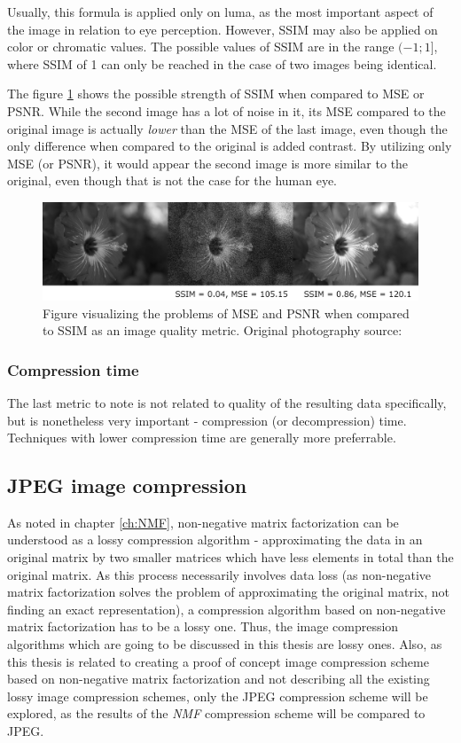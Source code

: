 \documentclass[thesis=M,english]{FITthesis}[2012/10/20]
\begin{document}
Usually, this formula is applied only on luma, as the most important aspect of the
image in relation to eye perception. However, SSIM may also be applied on color or
chromatic values. The possible values of SSIM are in the range $(-1; 1]$, where 
SSIM of 1 can only be reached in the case of two images being identical.

The figure \ref{fig:ssimmse} shows the possible strength of SSIM when compared to
MSE or PSNR. While the second image has a lot of noise in it, its MSE compared to
the original image is actually \emph{lower} than the MSE of the last image, even
though the only difference when compared to the original is added contrast.
By utilizing only MSE (or PSNR), it would appear the second image is more similar
to the original, even though that is not the case for the human eye.

\begin{figure}[h]
  \centering
  \includegraphics[scale=0.62]{imgs/flower_mse_psnr_ssim}
  \caption[Problems of MSE and PSNR as lossy compression quality metrics]{Figure visualizing the problems of MSE and PSNR when compared to
           SSIM as an image quality metric. Original photography source: \cite{imgcomprbenchmark}}
  \label{fig:ssimmse}
\end{figure}

\subsubsection{Compression time}
The last metric to note is not related to quality of the resulting data specifically,
but is nonetheless very important - compression (or decompression) time. Techniques
with lower compression time are generally more preferrable.

\subsection{JPEG image compression}
As noted in chapter \ref{ch:NMF}, non-negative matrix factorization can
be understood as a lossy compression algorithm - approximating the
data in an original matrix by two smaller matrices which have less
elements in total than the original matrix. As this process necessarily
involves data loss (as non-negative matrix factorization solves the problem
of approximating the original matrix, not finding an exact representation),
a compression algorithm based on non-negative matrix factorization has to be
a lossy one. Thus, the image compression algorithms which are going to be
discussed in this thesis are lossy ones. Also, as this thesis is related
to creating a proof of concept image compression scheme based on non-negative
matrix factorization and not describing all the existing lossy image
compression schemes, only the JPEG compression scheme will be explored,
as the results of the \emph{NMF} compression scheme will be compared to
JPEG.
\end{document}
